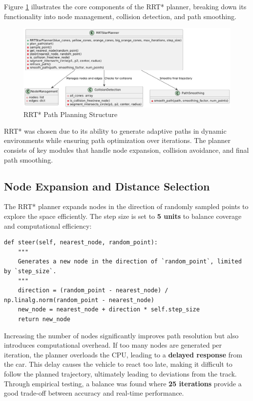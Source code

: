 \documentclass[a4paper,11pt]{report}
\begin{document}
Figure \ref{fig:rrtstar_structure} illustrates the core components of the RRT* planner, breaking down its functionality into node management, collision detection, and path smoothing.

\begin{figure}[h]
    \centering
    \includegraphics[width=\textwidth]{Images/rrt.png}
    \caption{RRT* Path Planning Structure}
    \label{fig:rrtstar_structure}
\end{figure}

RRT* was chosen due to its ability to generate adaptive paths in dynamic environments while ensuring path optimization over iterations. The planner consists of key modules that handle node expansion, collision avoidance, and final path smoothing.

\subsection{Node Expansion and Distance Selection}
The RRT* planner expands nodes in the direction of randomly sampled points to explore the space efficiently. The step size is set to \textbf{5 units} to balance coverage and computational efficiency:

\begin{verbatim}
def steer(self, nearest_node, random_point):
    """
    Generates a new node in the direction of `random_point`, limited by `step_size`.
    """
    direction = (random_point - nearest_node) / np.linalg.norm(random_point - nearest_node)
    new_node = nearest_node + direction * self.step_size
    return new_node
\end{verbatim}

Increasing the number of nodes significantly improves path resolution but also introduces computational overhead. If too many nodes are generated per iteration, the planner overloads the CPU, leading to a \textbf{delayed response} from the car. This delay causes the vehicle to react too late, making it difficult to follow the planned trajectory, ultimately leading to deviations from the track. Through empirical testing, a balance was found where \textbf{25 iterations} provide a good trade-off between accuracy and real-time performance.
\end{document}
